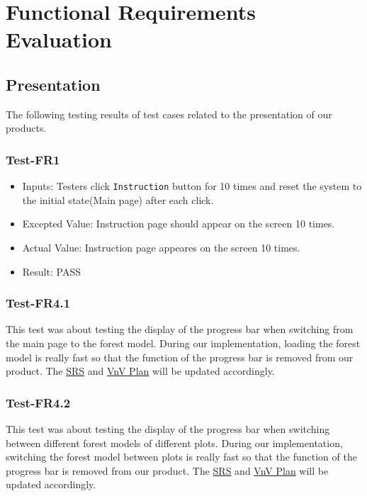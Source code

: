 \documentclass[12pt, titlepage]{article}
\begin{document}
\newpage


\section{Functional Requirements Evaluation}
\subsection{Presentation}
\noindent The following testing results of test cases 
related to the presentation of our products.

\newcommand{\pass}{{\color{Green}PASS}}
\newcommand{\fail}{{\color{Red}FAIL}}

\subsubsection{Test-FR1}
\begin{itemize}
\item Inputs: Testers click \verb|Instruction| button
for 10 times and reset the system to the initial 
state(Main page) after each click.
\item Excepted Value: Instruction page should appear 
on the screen 10 times.
\item Actual Value: Instruction page appeares on the 
screen 10 times.
\item Result: \pass
\end{itemize}

\subsubsection{Test-FR4.1}
This test was about testing the display of the progress 
bar when switching from the main page to the forest 
model. During our implementation, loading the forest 
model is really fast so that the function of 
the progress bar is removed from our product. The 
\href{https://github.com/wuj187/DigitalTwinCAS/blob/main/docs/SRS/SRS.pdf}{SRS}
and \href{https://github.com/wuj187/DigitalTwinCAS/blob/main/docs/VnVPlan/VnVPlan.pdf}{VnV Plan} will be updated accordingly.

\subsubsection{Test-FR4.2}
This test was about testing the display of the progress 
bar when switching between different forest models of 
different plots. 
During our implementation, switching 
the forest model between plots is really fast so that 
the function of 
the progress bar is removed from our product. The 
\href{https://github.com/wuj187/DigitalTwinCAS/blob/main/docs/SRS/SRS.pdf}{SRS}
and \href{https://github.com/wuj187/DigitalTwinCAS/blob/main/docs/VnVPlan/VnVPlan.pdf}{VnV Plan} will be updated accordingly.
\end{document}
